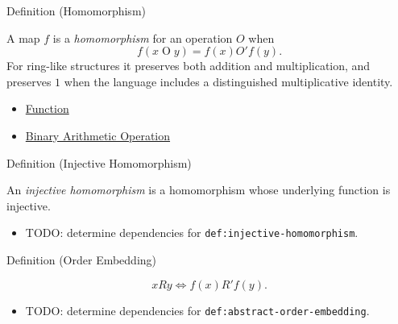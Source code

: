\begin{definitionbox}{Definition (Homomorphism)}
\begin{definition}[Homomorphism]
\label{def:homomorphism}
A map $f$ is a \emph{homomorphism} for an operation $O$ when
\[
f(x\mathbin{O}y)=f(x)\mathbin{O'}f(y).
\]
For ring-like structures it preserves both addition and multiplication, and
preserves $1$ when the language includes a distinguished multiplicative
identity.
\end{definition}
\end{definitionbox}

\begin{dependencies}
\begin{itemize}
  \item \hyperref[def:function]{Function}
  \item \hyperref[def:binary-arithmetic-operation]{Binary Arithmetic Operation}
\end{itemize}
\end{dependencies}

\begin{definitionbox}{Definition (Injective Homomorphism)}
\begin{definition}
\label{def:injective-homomorphism}
An \emph{injective homomorphism} is a homomorphism whose underlying function
is injective.
\end{definition}
\end{definitionbox}

\begin{dependencies}
\begin{itemize}
  \item TODO: determine dependencies for \texttt{def:injective-homomorphism}.
\end{itemize}
\end{dependencies}

\begin{definitionbox}{Definition (Order Embedding)}
\begin{definition}
\label{def:abstract-order-embedding}
\[
xRy \Longleftrightarrow f(x)R'f(y).
\]
\end{definition}
\end{definitionbox}

\begin{dependencies}
\begin{itemize}
  \item TODO: determine dependencies for \texttt{def:abstract-order-embedding}.
\end{itemize}
\end{dependencies}

